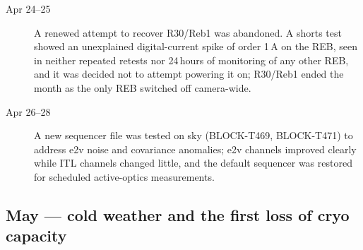\begin{description}
\item[Apr 24--25] A renewed attempt to recover R30/Reb1 was abandoned.
  A shorts test showed an unexplained digital-current spike of order
  1\,A on the REB, seen in neither repeated retests nor 24\,hours of
  monitoring of any other REB, and it was decided not to attempt
  powering it on; R30/Reb1 ended the month as the only REB switched
  off camera-wide.

\item[Apr 26--28] A new sequencer file was tested on sky
  (BLOCK-T469, BLOCK-T471) to address e2v noise and covariance
  anomalies; e2v channels improved clearly while ITL channels changed
  little, and the default sequencer was restored for scheduled
  active-optics measurements.
\end{description}

\subsection{May --- cold weather and the first loss of cryo capacity}
